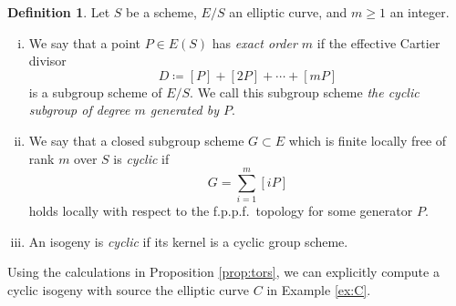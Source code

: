 \documentclass{gtpart}
\theoremstyle{definition}
\newtheorem{defn}[thm]{Definition}
\theoremstyle{remark}
\newcommand{\ce}{\coloneqq}
\numberwithin{equation}{section}
\numberwithin{thm}{section}
\begin{document}
\begin{defn}
\label{def:cyclic}
 Let $S$ be a scheme, $E/S$ an elliptic curve, and $m \geq 1$ an 
 integer.  
 \begin{enumerate}[(i)]
  \item We say that a point $P \in E(S)$ has {\em exact order $m$} if 
  the effective Cartier divisor 
  \[
   D \ce [P] + [2P] + \cdots + [mP] 
  \]
  is a subgroup scheme of $E/S$.  We call this subgroup scheme {\em the 
  cyclic subgroup of degree $m$ generated by $P$}.  

  \item We say that a closed subgroup scheme $G \subset E$ which is 
  finite locally free of rank $m$ over $S$ is {\em cyclic} if 
  \[
   G = \sum_{i=1}^m [iP] 
  \]
  holds locally with respect to the f.p.p.f.~topology for some generator 
  $P$.  

  \item An isogeny is {\em cyclic} if its kernel is a cyclic group 
  scheme.  
 \end{enumerate}
\end{defn}

Using the calculations in Proposition \ref{prop:tors}, we can explicitly 
compute a cyclic isogeny with source the elliptic curve $C$ in Example 
\ref{ex:C}.  
\end{document}
